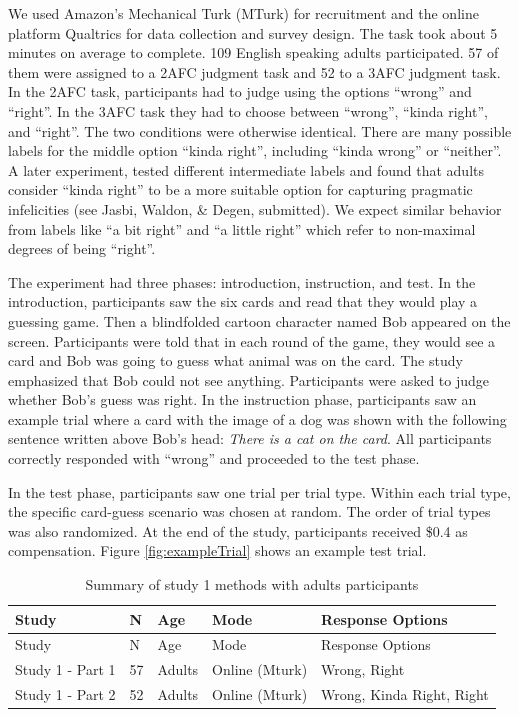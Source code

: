 \documentclass[floatsintext,man]{apa6}
\theoremstyle{definition}
\theoremstyle{definition}
\theoremstyle{definition}
\theoremstyle{remark}
\begin{document}
We used Amazon's Mechanical Turk (MTurk) for recruitment and the online
platform Qualtrics for data collection and survey design. The task took
about 5 minutes on average to complete. 109 English speaking adults
participated. 57 of them were assigned to a 2AFC judgment task and 52 to
a 3AFC judgment task. In the 2AFC task, participants had to judge using
the options \enquote{wrong} and \enquote{right}. In the 3AFC task they
had to choose between \enquote{wrong}, \enquote{kinda right}, and
\enquote{right}. The two conditions were otherwise identical. There are
many possible labels for the middle option \enquote{kinda right},
including \enquote{kinda wrong} or \enquote{neither}. A later
experiment, tested different intermediate labels and found that adults
consider \enquote{kinda right} to be a more suitable option for
capturing pragmatic infelicities (see Jasbi, Waldon, \& Degen,
submitted). We expect similar behavior from labels like \enquote{a bit
right} and \enquote{a little right} which refer to non-maximal degrees
of being \enquote{right}.

The experiment had three phases: introduction, instruction, and test. In
the introduction, participants saw the six cards and read that they
would play a guessing game. Then a blindfolded cartoon character named
Bob appeared on the screen. Participants were told that in each round of
the game, they would see a card and Bob was going to guess what animal
was on the card. The study emphasized that Bob could not see anything.
Participants were asked to judge whether Bob's guess was right. In the
instruction phase, participants saw an example trial where a card with
the image of a dog was shown with the following sentence written above
Bob's head: \emph{There is a cat on the card}. All participants
correctly responded with \enquote{wrong} and proceeded to the test
phase.

In the test phase, participants saw one trial per trial type. Within
each trial type, the specific card-guess scenario was chosen at random.
The order of trial types was also randomized. At the end of the study,
participants received \$0.4 as compensation. Figure
\ref{fig:exampleTrial} shows an example test trial.

\begin{longtable}[]{@{}lllll@{}}
\caption{\label{tab:study1info}Summary of study 1 methods with adults
participants}\tabularnewline
\toprule
Study & N & Age & Mode & Response Options\tabularnewline
\midrule
\endfirsthead
\toprule
Study & N & Age & Mode & Response Options\tabularnewline
\midrule
\endhead
Study 1 - Part 1 & 57 & Adults & Online (Mturk) & Wrong,
Right\tabularnewline
Study 1 - Part 2 & 52 & Adults & Online (Mturk) & Wrong, Kinda Right,
Right\tabularnewline
\bottomrule
\end{longtable}
\end{document}
